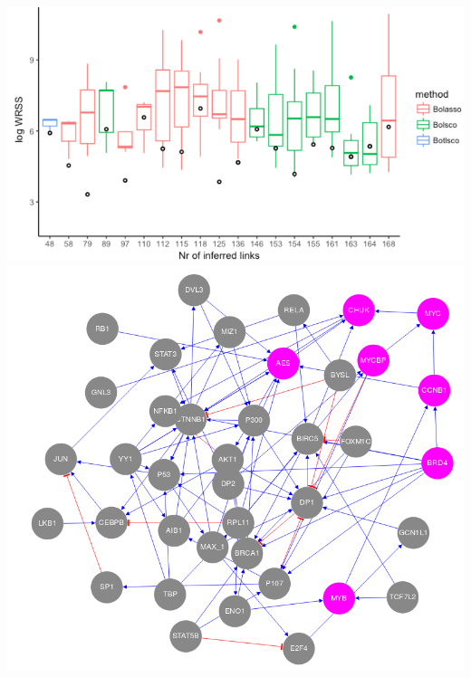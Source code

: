 \documentclass[a0,portrait]{a0poster}
\begin{document}
\begin{multicols}{2}
\begin{center}
\includegraphics[width=.59\linewidth]{MYC_perf.png}
\includegraphics[width=.39\linewidth]{LASSO_1145.png}
\end{center}














\end{multicols}
\color{SaddleBrown} %
\end{document}
